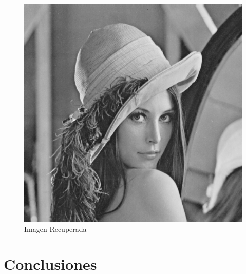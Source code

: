\documentclass{article}
\begin{document}
\begin{multicols}{2}
\begin{figure}[H]
\centering
\includegraphics[scale=0.2]{../img/corrected_BONUS.png}
\caption{Imagen Recuperada}

\end{figure}




\section{Conclusiones}


\end{multicols}
\end{document}
